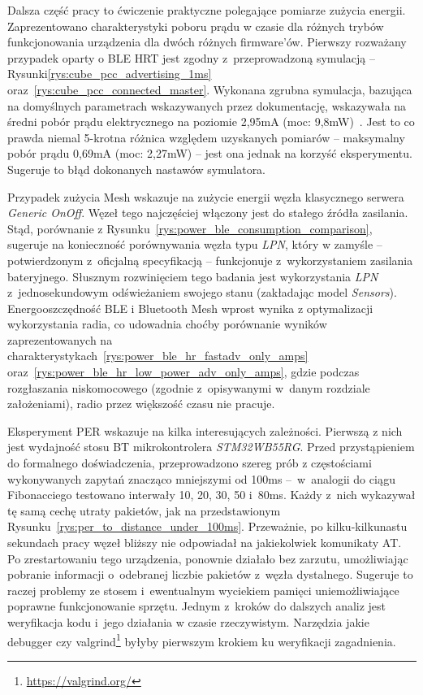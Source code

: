 Dalsza część pracy to ćwiczenie praktyczne polegające pomiarze zużycia energii. Zaprezentowano
charakterystyki poboru prądu w czasie dla różnych trybów funkcjonowania urządzenia dla dwóch różnych firmware'ów.
Pierwszy rozważany przypadek oparty o BLE \gls{HRT} jest zgodny z~przeprowadzoną symulacją -- 
Rysunki\ref{rys:cube_pcc_advertising_1ms} oraz~\ref{rys:cube_pcc_connected_master}. Wykonana zgrubna symulacja,
bazująca na domyślnych parametrach wskazywanych przez dokumentację,
wskazywała na średni pobór prądu elektrycznego na poziomie 2,95mA (moc: 9,8mW)~\cite{noauthor_um1718_2022}. Jest to co prawda niemal
5-krotna różnica względem uzyskanych pomiarów -- maksymalny pobór prądu 0,69mA (moc: 2,27mW) -- jest ona jednak na korzyść
eksperymentu. Sugeruje to błąd dokonanych nastawów symulatora.

Przypadek zużycia Mesh wskazuje na zużycie energii węzła klasycznego serwera \textit{Generic OnOff}. Węzeł tego
najczęściej włączony jest do stałego źródła zasilania. Stąd, porównanie z Rysunku~\ref{rys:power_ble_consumption_comparison},
sugeruje na konieczność porównywania węzła typu \textit{LPN}, który w zamyśle -- potwierdzonym z~oficjalną specyfikacją
-- funkcjonuje z~wykorzystaniem zasilania bateryjnego. Słusznym rozwinięciem tego badania jest wykorzystania
\textit{LPN} z~jednosekundowym odświeżaniem swojego stanu (zakładając model \textit{Sensors}). Energooszczędność
BLE i Bluetooth Mesh wprost wynika z optymalizacji wykorzystania radia, co udowadnia choćby porównanie
wyników zaprezentowanych na charakterystykach~\ref{rys:power_ble_hr_fastadv_only_amps} oraz~\ref{rys:power_ble_hr_low_power_adv_only_amps},
gdzie podczas rozgłaszania niskomocowego (zgodnie z~opisywanymi w~danym rozdziale założeniami), radio przez większość
czasu nie pracuje.

Eksperyment PER wskazuje na kilka interesujących zależności. Pierwszą z nich jest wydajność stosu \gls{BT} mikrokontrolera \textit{STM32WB55RG}.
Przed przystąpieniem do formalnego doświadczenia, przeprowadzono szereg prób z częstościami wykonywanych zapytań
znacząco mniejszymi od 100ms --~w~analogii do ciągu Fibonacciego testowano interwały 10, 20, 30, 50 i~80ms. Każdy z~nich wykazywał
tę samą cechę utraty pakietów, jak na przedstawionym Rysunku~\ref{rys:per_to_distance_under_100ms}. Przeważnie,
po kilku-kilkunastu sekundach pracy węzeł bliższy nie odpowiadał na jakiekolwiek komunikaty AT. Po zrestartowaniu tego urządzenia,
ponownie działało bez zarzutu, umożliwiając pobranie informacji o~odebranej liczbie pakietów z~węzła dystalnego.
Sugeruje to raczej problemy ze stosem i~ewentualnym wyciekiem pamięci uniemożliwiające poprawne funkcjonowanie sprzętu.
Jednym z~kroków do dalszych analiz jest weryfikacja kodu i~jego działania w czasie rzeczywistym. Narzędzia jakie debugger
czy valgrind\footnote{\url{https://valgrind.org/}} byłyby pierwszym krokiem ku weryfikacji zagadnienia.

